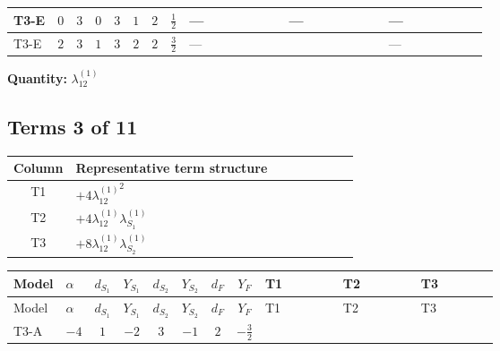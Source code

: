 \documentclass[8pt]{article}
\begin{document}
\begin{landscape}
\begin{longtable}{@{}llcccccc >{\raggedright\arraybackslash}p{0.21\linewidth} >{\raggedright\arraybackslash}p{0.21\linewidth} >{\raggedright\arraybackslash}p{0.21\linewidth}@{}}
\midrule
T3-E & $0$ & $3$ & $0$ & $3$ & $1$ & $2$ & $\frac{1}{2}$ & --- & --- & --- \\
\midrule
T3-E & $2$ & $3$ & $1$ & $3$ & $2$ & $2$ & $\frac{3}{2}$ & --- & \scriptsize\adjustbox{max width=\linewidth}{$\begin{gathered} +48 {g_1}^4\end{gathered}$} & --- \\
\midrule
\bottomrule
\end{longtable}
\clearpage
\noindent\textbf{Quantity: }$\lambda_{12}^{(1)}$\par\smallskip
\subsection*{Terms 3 of 11}
\begin{center}
\begin{tabular}{@{}c >{\raggedright\arraybackslash}p{0.82\linewidth}@{}}
\toprule
Column & Representative term structure \\
\midrule
T1 & \(\displaystyle +4 {\lambda_{12}^{(1)}}^2\) \\
\midrule
T2 & \(\displaystyle +4 {\lambda_{12}^{(1)}} {\lambda_{S_1}^{(1)}}\) \\
\midrule
T3 & \(\displaystyle +8 {\lambda_{12}^{(1)}} {\lambda_{S_2}^{(1)}}\) \\
\midrule
\bottomrule
\end{tabular}
\end{center}
\smallskip
\tiny
\begin{longtable}{@{}llcccccc >{\raggedright\arraybackslash}p{0.21\linewidth} >{\raggedright\arraybackslash}p{0.21\linewidth} >{\raggedright\arraybackslash}p{0.21\linewidth}@{}}
\toprule
Model & $\alpha$ & $d_{S_1}$ & $Y_{S_1}$ & $d_{S_2}$ & $Y_{S_2}$ & $d_F$ & $Y_F$ & T1 & T2 & T3 \\
\midrule
\endfirsthead
\toprule
Model & $\alpha$ & $d_{S_1}$ & $Y_{S_1}$ & $d_{S_2}$ & $Y_{S_2}$ & $d_F$ & $Y_F$ & T1 & T2 & T3 \\
\midrule
\endhead
T3-A & $-4$ & $1$ & $-2$ & $3$ & $-1$ & $2$ & $-\frac{3}{2}$ & \scriptsize\adjustbox{max width=\linewidth}{$\begin{gathered} +4 {\lambda_{12}^{(1)}}^2\end{gathered}$} & \scriptsize\adjustbox{max width=\linewidth}{$\begin{gathered} +4 {\lambda_{12}^{(1)}} {\lambda_{S_1}^{(1)}}\end{gathered}$} & \scriptsize\adjustbox{max width=\linewidth}{$\begin{gathered} +8 {\lambda_{12}^{(1)}} {\lambda_{S_2}^{(1)}}\end{gathered}$} \\

\end{longtable}
\end{landscape}
\end{document}
